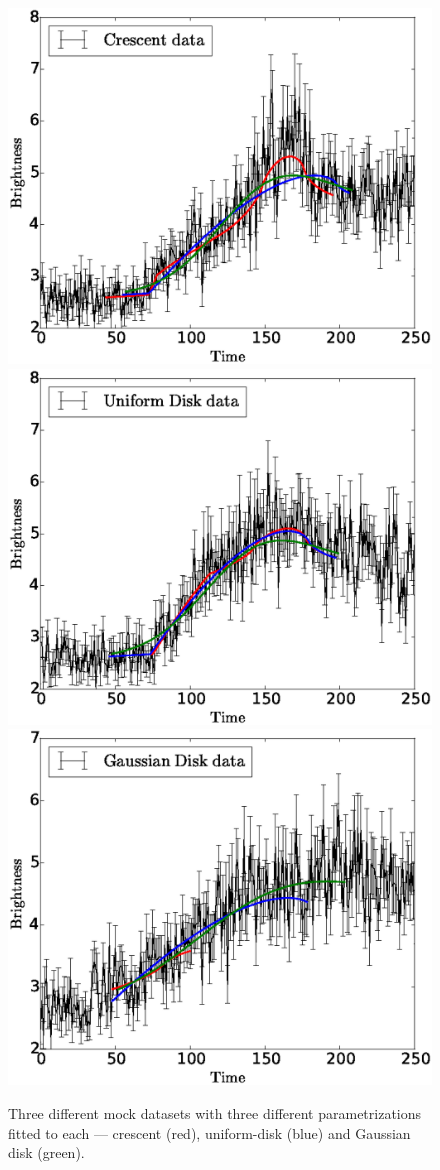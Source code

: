 \documentclass[usenatbib]{mn2e}
\begin{document}
\begin{figure}
\centering
\includegraphics[width=0.9\hsize]{figures/data_cc.eps}
\includegraphics[width=0.9\hsize]{figures/data_dd.eps}
\includegraphics[width=0.9\hsize]{figures/data_gg.eps}
\caption{\label{fig:mockdata} Three different mock datasets with
  three different parametrizations fitted to each --- crescent (red),
  uniform-disk (blue) and Gaussian disk (green).}
\end{figure}
\end{document}
